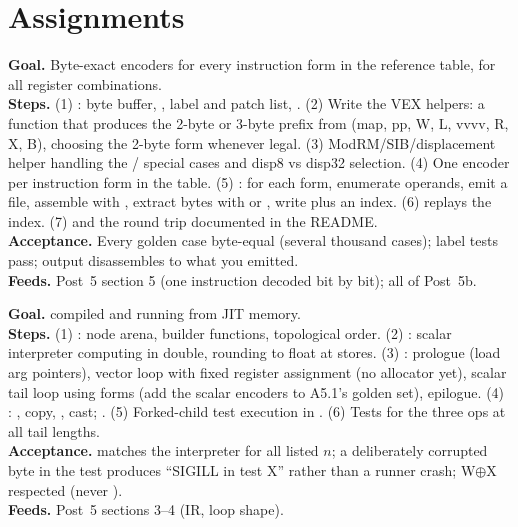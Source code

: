 \section{Assignments}

\textbf{Goal.} Byte-exact encoders for every instruction form in the reference table, for all register combinations.\\
\textbf{Steps.} (1) : byte buffer, , label and patch list, . (2) Write the VEX helpers: a function that produces the 2-byte or 3-byte prefix from (map, pp, W, L, vvvv, R, X, B), choosing the 2-byte form whenever legal. (3) ModRM/SIB/displacement helper handling the / special cases and disp8 vs disp32 selection. (4) One encoder per instruction form in the table. (5) : for each form, enumerate operands, emit a  file, assemble with , extract bytes with  or , write  plus an index. (6)  replays the index. (7)  and the  round trip documented in the README.\\
\textbf{Acceptance.} Every golden case byte-equal (several thousand cases); label tests pass;  output disassembles to what you emitted.\\
\textbf{Feeds.} Post~5 section 5 (one instruction decoded bit by bit); all of Post~5b.

\textbf{Goal.}  compiled and running from JIT memory.\\
\textbf{Steps.} (1) : node arena, builder functions, topological order. (2) : scalar interpreter computing in double, rounding to float at stores. (3) : prologue (load arg pointers), vector loop with fixed register assignment (no allocator yet), scalar tail loop using  forms (add the scalar encoders to A5.1's golden set), epilogue. (4) : , copy, , cast; . (5) Forked-child test execution in . (6) Tests for the three ops at all tail lengths.\\
\textbf{Acceptance.}  matches the interpreter for all listed $n$; a deliberately corrupted byte in the test produces ``SIGILL in test X'' rather than a runner crash; W$\oplus$X respected (never ).\\
\textbf{Feeds.} Post~5 sections 3--4 (IR, loop shape).

